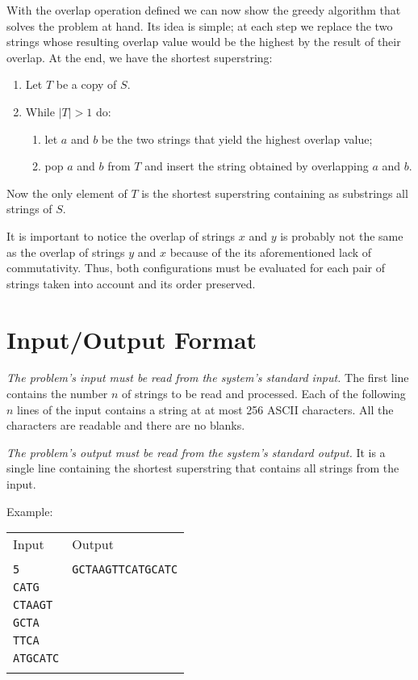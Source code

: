 \documentclass[a4paper]{article}
\begin{document}
With the overlap operation defined we can now show the greedy algorithm that solves the problem at hand.
Its idea is simple; at each step we replace the two strings whose resulting overlap value would be the highest by the result of their overlap.
At the end, we have the shortest superstring:
\begin{enumerate}
    \item Let $T$ be a copy of $S$.
    \item While $|T| > 1$ do:
        \begin{enumerate}
            \item let $a$ and $b$ be the two strings that yield the highest overlap value;
            \item pop $a$ and $b$ from $T$ and insert the string obtained by overlapping $a$ and $b$.
        \end{enumerate}
\end{enumerate}
Now the only element of $T$ is the shortest superstring containing as substrings all strings of $S$.

It is important to notice the overlap of strings $x$ and $y$ is probably not the same as the overlap of strings $y$ and $x$ because of the its aforementioned lack of commutativity.
Thus, both configurations must be evaluated for each pair of strings taken into account and its order preserved.

\section{Input/Output Format}

\emph{The problem's input must be read from the system's standard input.}
The first line contains the number $n$ of strings to be read and processed.
Each of the following $n$ lines of the input contains a string at at most 256 ASCII characters.
All the characters are readable and there are no blanks.

\emph{The problem's output must be read from the system's standard output.}
It is a single line containing the shortest superstring that contains all strings from the input.

Example:
\begin{center}
    \begin{tabular}{|p{}|p{}|}
        \hline
        Input            & Output                    \\
        $~$              & $~$                       \\
        \texttt{5}       & \texttt{GCTAAGTTCATGCATC} \\
        \texttt{CATG}    &                           \\
        \texttt{CTAAGT}  &                           \\
        \texttt{GCTA}    &                           \\
        \texttt{TTCA}    &                           \\
        \texttt{ATGCATC} &                           \\
        $~$              & $~$                       \\
        \hline
    \end{tabular}
\end{center}
\end{document}
